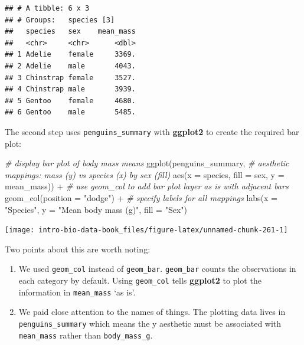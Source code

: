 \documentclass[
]{book}
\newenvironment{Shaded}{\begin{snugshade}}{\end{snugshade}}
\newcommand{\AttributeTok}[1]{\textcolor[rgb]{0.77,0.63,0.00}{#1}}
\newcommand{\CommentTok}[1]{\textcolor[rgb]{0.56,0.35,0.01}{\textit{#1}}}
\newcommand{\FunctionTok}[1]{\textcolor[rgb]{0.00,0.00,0.00}{#1}}
\newcommand{\NormalTok}[1]{#1}
\newcommand{\SpecialCharTok}[1]{\textcolor[rgb]{0.00,0.00,0.00}{#1}}
\newcommand{\StringTok}[1]{\textcolor[rgb]{0.31,0.60,0.02}{#1}}
\providecommand{\tightlist}{%
  \setlength{\itemsep}{0pt}\setlength{\parskip}{0pt}}
\begin{document}
\begin{verbatim}
## # A tibble: 6 x 3
## # Groups:   species [3]
##   species   sex    mean_mass
##   <chr>     <chr>      <dbl>
## 1 Adelie    female     3369.
## 2 Adelie    male       4043.
## 3 Chinstrap female     3527.
## 4 Chinstrap male       3939.
## 5 Gentoo    female     4680.
## 6 Gentoo    male       5485.
\end{verbatim}

The second step uses \texttt{penguins\_summary} with \textbf{ggplot2} to create the required bar plot:

\begin{Shaded}
\begin{Highlighting}[]
\CommentTok{\# display bar plot of body mass means}
\FunctionTok{ggplot}\NormalTok{(penguins\_summary,}
       \CommentTok{\# aesthetic mappings: mass (y) vs species (x) by sex (fill)}
       \FunctionTok{aes}\NormalTok{(}\AttributeTok{x =}\NormalTok{ species, }\AttributeTok{fill =}\NormalTok{ sex, }\AttributeTok{y =}\NormalTok{ mean\_mass)) }\SpecialCharTok{+}
  \CommentTok{\# use geom\_col to add bar plot layer \textquotesingle{}as is\textquotesingle{} with adjacent bars}
  \FunctionTok{geom\_col}\NormalTok{(}\AttributeTok{position =} \StringTok{"dodge"}\NormalTok{) }\SpecialCharTok{+} 
  \CommentTok{\# specify labels for all mappings}
  \FunctionTok{labs}\NormalTok{(}\AttributeTok{x =} \StringTok{"Species"}\NormalTok{, }\AttributeTok{y =} \StringTok{"Mean body mass (g)"}\NormalTok{, }\AttributeTok{fill =} \StringTok{"Sex"}\NormalTok{)}
\end{Highlighting}
\end{Shaded}

\begin{center}\texttt{[image: intro-bio-data-book\_files/figure-latex/unnamed-chunk-261-1]} \end{center}

Two points about this are worth noting:

\begin{enumerate}
\def\labelenumi{\arabic{enumi}.}
\tightlist
\item
  We used \texttt{geom\_col} instead of \texttt{geom\_bar}. \texttt{geom\_bar} counts the observations in each category by default. Using \texttt{geom\_col} tells \textbf{ggplot2} to plot the information in \texttt{mean\_mass} `as is'.
\item
  We paid close attention to the names of things. The plotting data lives in \texttt{penguins\_summary} which means the y aesthetic must be associated with \texttt{mean\_mass} rather than \texttt{body\_mass\_g}.
\end{enumerate}
\end{document}
